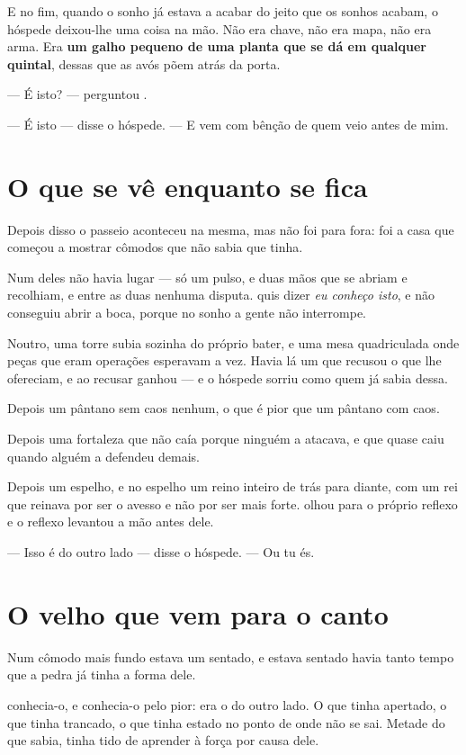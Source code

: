 \documentclass[livro.tex]{subfiles}
\begin{document}
\medskip
\noindent E no fim, quando o sonho já estava a acabar do jeito que os sonhos
acabam, o hóspede deixou-lhe uma coisa na mão. Não era chave, não era mapa, não
era arma. Era \textbf{um galho pequeno de uma planta que se dá em qualquer
quintal}, dessas que as avós põem atrás da porta.

--- É isto? --- perguntou \Ben .

--- É isto --- disse o hóspede. --- E vem com bênção de quem veio antes de mim.

\section{O que se vê enquanto se fica}

Depois disso o passeio aconteceu na mesma, mas não foi para fora: foi a casa que
começou a mostrar cômodos que \Ben não sabia que tinha.

Num deles não havia lugar --- só um pulso, e duas mãos que se abriam e
recolhiam, e entre as duas nenhuma disputa. \Ben quis dizer \emph{eu conheço
isto}, e não conseguiu abrir a boca, porque no sonho a gente não interrompe.

Noutro, uma torre subia sozinha do próprio bater, e uma mesa quadriculada onde
peças que eram operações esperavam a vez. Havia lá um que recusou o que lhe
ofereciam, e ao recusar ganhou --- e o hóspede sorriu como quem já sabia dessa.

\medskip
\noindent Depois um pântano sem caos nenhum, o que é pior que um pântano com
caos.

Depois uma fortaleza que não caía porque ninguém a atacava, e que quase caiu
quando alguém a defendeu demais.

Depois um espelho, e no espelho um reino inteiro de trás para diante, com um rei
que reinava por ser o avesso e não por ser mais forte. \Ben olhou para o
próprio reflexo e o reflexo levantou a mão antes dele.

\medskip
\noindent --- Isso é do outro lado --- disse o hóspede. --- Ou tu és.

\section{O velho que vem para o canto}

Num cômodo mais fundo estava um sentado, e estava sentado havia tanto tempo que
a pedra já tinha a forma dele.

\Ben conhecia-o, e conhecia-o pelo pior: era o do outro lado. O que tinha
apertado, o que tinha trancado, o que tinha estado no ponto de onde não se sai.
Metade do que \Ben sabia, tinha tido de aprender à força por causa dele.
\end{document}
